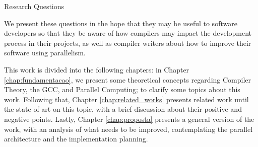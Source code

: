 \begin{section}{Research Questions}

We present these questions in the hope that they may be useful to software
developers so that they be aware of how compilers may impact the development
process in their projects, as well as compiler writers about how to improve
their software using parallelism.

This work is divided into the following chapters: in Chapter
\ref{chap:fundamentacao}, we present some theoretical concepts regarding
Compiler Theory, the GCC,  and Parallel Computing; to clarify some topics about this work.
Following that, Chapter \ref{chap:related_works} presents related work until
the state of art on this topic, with a brief discussion about their positive
and negative points.  Lastly, Chapter \ref{chap:proposta} presents a general
version of the work, with an analysis of what needs to be improved,
contemplating the parallel architecture and the implementation planning.



\end{section}
